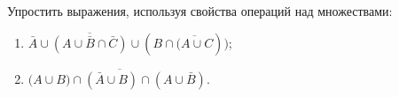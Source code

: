 \question
Упростить выражения, используя свойства операций над множествами:

\begin{enumerate}
	\renewcommand{\labelenumi}{\alph{enumi})}
	\item $\bar{A} \cup \overline{(A \cup \bar{B} \cap \bar{C})} \cup(B \cap \overline{(A \cup C}))$;
	\item $(\overline{A \cup B) \cap(\bar{A} \cup B) \cap(A \cup \bar{B})}$.
\end{enumerate}

